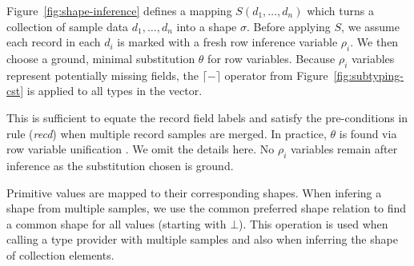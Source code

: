 \documentclass[10pt]{sigplanconf}
\newcommand{\addopt}[1]{\lceil#1\rceil}
\newcommand{\semalt}[1]{S(#1)}
\begin{document}
Figure~\ref{fig:shape-inference} defines a mapping $\semalt{d_1,\ldots,d_n}$ which turns a 
collection of sample data $d_1, \ldots, d_n$ into a shape $\sigma$. Before applying $S$, we assume 
each record in each $d_i$ is marked with a fresh row inference variable $\rho_i$. 
We then choose a ground, minimal substitution $\theta$ for row variables. Because $\rho_i$ variables 
represent potentially missing fields, the $\addopt{-}$ operator from Figure~\ref{fig:subtyping-cst} 
is applied to all types in the vector. 

This is sufficient to equate the record field labels and satisfy the pre-conditions in rule 
(\emph{recd}) when multiple record samples are merged. In practice, $\theta$ is found via row 
variable unification \cite{rows-remy}. We omit the details here. No $\rho_i$ variables remain after 
inference as the substitution chosen is ground.

Primitive  values are mapped to their corresponding shapes. 
When infering a shape from multiple samples, we use the common preferred shape relation to find a 
common shape for all values (starting with $\bot$). This operation is used  
when calling a type provider with multiple samples and also when inferring the shape of collection
elements.

\end{document}
